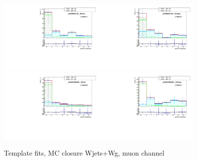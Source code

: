 \begin{figure}[htb]
\begin{center}
   \includegraphics[width=0.45\textwidth]{../figs/figs_v11/MUON_WGamma/MCclosureWjetsPlusWg/c_TEMPL_CHISO_UNblind__phoEt95to120__Barrel__RooFit_MCclosure.pdf}\includegraphics[width=0.45\textwidth]{../figs/figs_v11/MUON_WGamma/MCclosureWjetsPlusWg/c_TEMPL_CHISO_UNblind__phoEt95to120__Endcap__RooFit_MCclosure.pdf}\\
   \includegraphics[width=0.45\textwidth]{../figs/figs_v11/MUON_WGamma/MCclosureWjetsPlusWg/c_TEMPL_CHISO_UNblind__phoEt120to500__Barrel__RooFit_MCclosure.pdf}\includegraphics[width=0.45\textwidth]{../figs/figs_v11/MUON_WGamma/MCclosureWjetsPlusWg/c_TEMPL_CHISO_UNblind__phoEt120to500__Endcap__RooFit_MCclosure.pdf}\\
  \label{fig:templateFits_MCclosureWjetsPlusWg_CHISO_MUON_3}
  \caption{Template fits, MC closure Wjets+Wg, muon channel}
  \end{center}
\end{figure}

